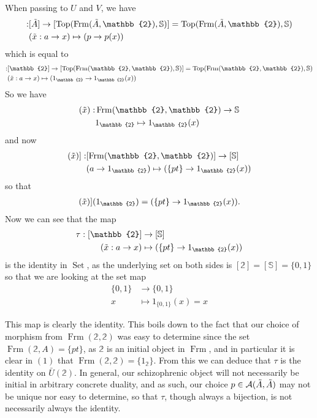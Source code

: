 \documentclass[12pt,a4paper]{article}
\DeclareMathOperator{\Set}{Set}
\DeclareMathOperator{\Frm}{Frm}
\DeclareMathOperator{\Top}{Top}
\def\HomA{\ensuremath\mathcal{A}}
\def\t{\ensuremath\tilde}
\begin{document}
When passing to $U$ and $V$, we have
\begin{align*}
	[\epsilon_{\t A}]:& [\t A] \to [\Top(\Frm(\t A, \mathbb{2}), \mathbb{S})] = \Top(\Frm(\t A, \mathbb{2}), \mathbb{S})\\
	&(\t x: a \to x) \mapsto (p \to p(x))
\end{align*}
which is equal to
\begin{align}
	[\epsilon_{\mathbb{2}}]:& [\mathbb{2}] \to [\Top(\Frm(\mathbb{2}, \mathbb{2}), \mathbb{S})] = \Top(\Frm(\mathbb{2}, \mathbb{2}), \mathbb{S})\\
	&(\t x: a \to x) \mapsto (1_{\mathbb{2}} \to 1_{\mathbb{2}}(x))
\end{align}
So we have 
\begin{align*}
	[\epsilon_{\mathbb{2}}](\t x):& \Frm(\mathbb{2},\mathbb{2}) \to \mathbb{S}\\
	&1_{\mathbb{2}} \mapsto 1_{\mathbb{2}}(x)
\end{align*}
and now
\begin{align*}
	[[\epsilon_{\mathbb{2}}](\t x)]:& [\Frm(\mathbb{2},\mathbb{2})] \to [\mathbb{S}]\\
	&(a \to 1_{\mathbb{2}}) \mapsto (\{pt\} \to1_{\mathbb{2}}(x))
\end{align*}
so that 
\begin{align*}
	[[\epsilon_{\mathbb{2}}](\t x)](1_{\mathbb{2}}) = (\{pt\} \to 1_{\mathbb{2}}(x)).
\end{align*}
Now we can see that the map \begin{align*}
	\tau: [\mathbb{2}] &\to [\mathbb{S}]\\
	(\t x: a \to x) &\mapsto (\{pt\} \to 1_{\mathbb{2}}(x))
\end{align*}
is the identity in $\Set$, as the underlying set on both sides is $[\mathbb{2}] = [\mathbb{S}] = \{0,1\}$ so that we are looking at the set map \begin{align*}
	\{0,1\} &\to \{0,1\}\\
	x &\mapsto 1_{\{0,1\}}(x)= x
\end{align*}

This map is clearly the identity. This boils down to the fact that our choice of morphism from $\Frm(\mathbb{2},\mathbb{2})$ was easy to determine since the set $\Frm(\mathbb{2},A) = \{pt\}$, as $\mathbb{2}$ is an initial object in $\Frm$, and in particular it is clear in $(1)$ that $\Frm(\mathbb{2},\mathbb{2}) = \{1_{\mathbb{2}}\}$. From this we can deduce that $\tau$ is the identity on $\bar U(\mathbb{2})$.
In general, our schizophrenic object will not necessarily be initial in arbitrary concrete duality, and as such, our choice $p \in \HomA(\t A, \t A)$ may not be unique nor easy to determine, so that $\tau$, though always a bijection, is not necessarily always the identity. 
\end{document}
